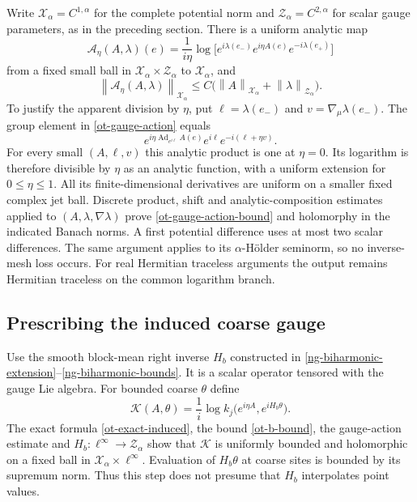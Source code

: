\documentclass[11pt]{article}
\theoremstyle{remark}
\newcommand{\norm}[1]{\left\|#1\right\|}
\begin{document}
Write $\mathcal X_\alpha=C^{1,\alpha}$ for the complete
potential norm and $\mathcal Z_\alpha=C^{2,\alpha}$ for scalar
gauge parameters, as in the preceding section. There is a
uniform analytic map
\begin{equation}\label{ot-gauge-action}
 \mathscr A_\eta(A,\lambda)(e)
  =\frac1{i\eta}\log\bigl[
      e^{i\lambda(e_-)}e^{i\eta A(e)}e^{-i\lambda(e_+)}\bigr]
\end{equation}
from a fixed small ball in
$\mathcal X_\alpha\times\mathcal Z_\alpha$ to
$\mathcal X_\alpha$, and
\begin{equation}\label{ot-gauge-action-bound}
 \norm{\mathscr A_\eta(A,\lambda)}_{\mathcal X_\alpha}
       \le C\bigl(\norm{A}_{\mathcal X_\alpha}
                       +\norm{\lambda}_{\mathcal Z_\alpha}\bigr).
\end{equation}
To justify the apparent division by $\eta$, put
$\ell=\lambda(e_-)$ and $v=\nabla_\mu\lambda(e_-)$.
The group element in \eqref{ot-gauge-action} equals
\[
 e^{i\eta\operatorname{Ad}_{e^{i\ell}}A(e)}
        e^{i\ell}e^{-i(\ell+\eta v)}.
\]
For every small $(A,\ell,v)$ this analytic product is one
at $\eta=0$. Its logarithm is therefore divisible by $\eta$
as an analytic function, with a uniform extension for
$0\le\eta\le1$. All its finite-dimensional derivatives are
uniform on a smaller fixed complex jet ball. Discrete product,
shift and analytic-composition estimates applied to
$(A,\lambda,\nabla\lambda)$ prove
\eqref{ot-gauge-action-bound} and holomorphy in the indicated
Banach norms. A first potential difference uses at most two
scalar differences. The same argument applies to its
$\alpha$-H\"older seminorm, so no inverse-mesh loss occurs.
For real Hermitian traceless arguments the output remains
Hermitian traceless on the common logarithm branch.

\subsection{Prescribing the induced coarse gauge}

Use the smooth block-mean right inverse $H_b$ constructed in
\eqref{ng-biharmonic-extension}--\eqref{ng-biharmonic-bounds}.
It is a scalar operator tensored with the gauge Lie algebra.
For bounded coarse $\theta$ define
\begin{equation}\label{ot-K-definition}
 \mathcal K(A,\theta)=\frac1i\log
      k_j\bigl(e^{i\eta A},e^{iH_b\theta}\bigr).
\end{equation}
The exact formula \eqref{ot-exact-induced}, the bound
\eqref{ot-b-bound}, the gauge-action estimate and
$H_b:\ell^\infty\to\mathcal Z_\alpha$ show that
$\mathcal K$ is uniformly bounded and holomorphic on a
fixed ball in $\mathcal X_\alpha\times\ell^\infty$.
Evaluation of $H_b\theta$ at coarse sites is bounded by
its supremum norm. Thus this step does not presume that
$H_b$ interpolates point values.
\end{document}
